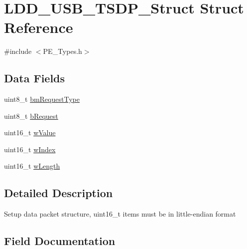 \hypertarget{struct_l_d_d___u_s_b___t_s_d_p___struct}{}\section{L\+D\+D\+\_\+\+U\+S\+B\+\_\+\+T\+S\+D\+P\+\_\+\+Struct Struct Reference}
\label{struct_l_d_d___u_s_b___t_s_d_p___struct}


{\ttfamily \#include $<$P\+E\+\_\+\+Types.\+h$>$}

\subsection*{Data Fields}
\begin{DoxyCompactItemize}
\item 
uint8\+\_\+t \hyperlink{struct_l_d_d___u_s_b___t_s_d_p___struct_afddb7f5f46fc265c07889888d1307a79}{bm\+Request\+Type}
\item 
uint8\+\_\+t \hyperlink{struct_l_d_d___u_s_b___t_s_d_p___struct_a38ea083d899a28927d0de58dd646054f}{b\+Request}
\item 
uint16\+\_\+t \hyperlink{struct_l_d_d___u_s_b___t_s_d_p___struct_abe97822a1a8976f53da5a43b8db8cfd3}{w\+Value}
\item 
uint16\+\_\+t \hyperlink{struct_l_d_d___u_s_b___t_s_d_p___struct_af04dcae50f0c8d6b27bd1e70f1af89d6}{w\+Index}
\item 
uint16\+\_\+t \hyperlink{struct_l_d_d___u_s_b___t_s_d_p___struct_a9015bd09ca306fdb49943219fafe3fe3}{w\+Length}
\end{DoxyCompactItemize}


\subsection{Detailed Description}
Setup data packet structure, uint16\+\_\+t items must be in little-\/endian format 

\subsection{Field Documentation}
\hypertarget{struct_l_d_d___u_s_b___t_s_d_p___struct_afddb7f5f46fc265c07889888d1307a79}{}
